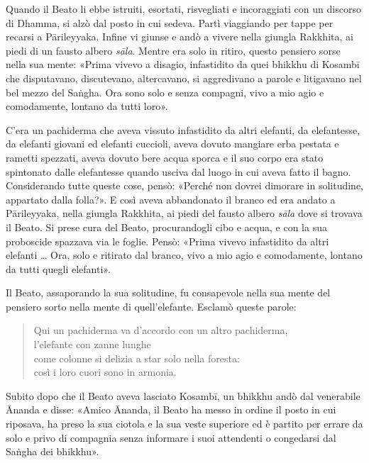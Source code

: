 

 Quando il Beato li ebbe istruiti, esortati, risvegliati e
incoraggiati con un discorso di Dhamma, si alzò dal posto in cui sedeva.
Partì viaggiando per tappe per recarsi a Pārileyyaka. Infine vi giunse e
andò a vivere nella giungla Rakkhita, ai piedi di un fausto albero
\emph{sāla}. Mentre era solo in ritiro, questo pensiero sorse nella sua
mente: «Prima vivevo a disagio, infastidito da quei bhikkhu di Kosambī
che disputavano, discutevano, altercavano, si aggredivano a parole e
litigavano nel bel mezzo del Saṅgha. Ora sono solo e senza compagni,
vivo a mio agio e comodamente, lontano da tutti loro».


C’era un pachiderma che aveva vissuto infastidito da altri elefanti, da
elefantesse, da elefanti giovani ed elefanti cuccioli, aveva dovuto
mangiare erba pestata e rametti spezzati, aveva dovuto bere acqua sporca
e il suo corpo era stato spintonato dalle elefantesse quando usciva dal
luogo in cui aveva fatto il bagno. Considerando tutte queste cose,
pensò: «Perché non dovrei dimorare in solitudine, appartato dalla
folla?». E così aveva abbandonato il branco ed era andato a Pārileyyaka,
nella giungla Rakkhita, ai piedi del fausto albero \emph{sāla} dove si
trovava il Beato. Si prese cura del Beato, procurandogli cibo e acqua, e
con la sua proboscide spazzava via le foglie. Pensò: «Prima vivevo
infastidito da altri elefanti … Ora, solo e ritirato dal branco, vivo a
mio agio e comodamente, lontano da tutti quegli elefanti».


Il Beato, assaporando la sua solitudine, fu consapevole nella sua mente
del pensiero sorto nella mente di quell’elefante. Esclamò queste parole:


\begin{quote}
Qui un pachiderma va d’accordo con un altro pachiderma, \\
l’elefante con zanne lunghe \\
come colonne si delizia a star solo nella foresta: \\
così i loro cuori sono in armonia.
\end{quote}



 Subito dopo che il Beato aveva lasciato Kosambī, un bhikkhu
andò dal venerabile Ānanda e disse: «Amico Ānanda, il Beato ha messo in
ordine il posto in cui riposava, ha preso la sua ciotola e la sua veste
superiore ed è partito per errare da solo e privo di compagnia senza
informare i suoi attendenti o congedarsi dal Saṅgha dei bhikkhu».


